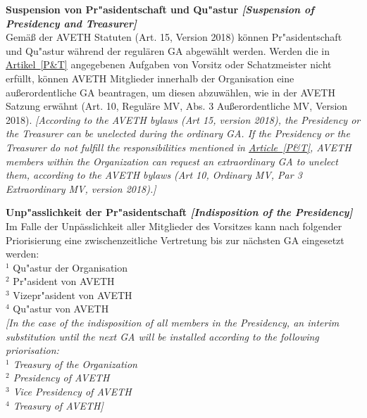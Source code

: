 \documentclass[10pt]{article}
\newcounter{qcounter}
\begin{document}
\begin{list}{{\bf Artikel :~}}{}
\item {\bf Suspension von Pr"asidentschaft und Qu"astur {\it[Suspension of Presidency and Treasurer]}}\label{suspension}\\
Gemäß der AVETH Statuten (Art. 15, Version 2018) können Pr"asidentschaft und Qu"astur während der regulären GA abgewählt werden. Werden die in \hyperref[P&T]{Artikel~\ref{P&T}} angegebenen Aufgaben von Vorsitz oder Schatzmeister nicht erfüllt, können AVETH Mitglieder innerhalb der Organisation eine außerordentliche GA beantragen, um diesen abzuwählen, wie in der AVETH Satzung erwähnt (Art. 10, Reguläre MV, Abs. 3 Außerordentliche MV, Version 2018).
{\it[According to the AVETH bylaws (Art 15, version 2018), the Presidency or the Treasurer can be unelected during the ordinary GA. If the Presidency or the Treasurer do not fulfill the responsibilities mentioned in \hyperref[P&T]{Article~\ref{P&T}}, AVETH members within the Organization can request an extraordinary GA to unelect them, according to the AVETH bylaws (Art 10, Ordinary MV, Par 3 Extraordinary MV, version 2018).]}

\item {\bf Unp"asslichkeit der Pr"asidentschaft {\it[Indisposition of the Presidency]}}\\
Im Falle der Unpässlichkeit aller Mitglieder des Vorsitzes kann nach folgender Priorisierung eine zwischenzeitliche Vertretung bis zur nächsten GA eingesetzt werden:\\
$^{1}$ Qu"astur der Organisation\\
$^{2}$ Pr"asident von AVETH\\
$^{3}$ Vizepr"asident von AVETH\\
$^{4}$ Qu"astur von AVETH\\
{\it[In the case of the indisposition of all members in the Presidency, an interim substitution until the next GA will be installed according to the following priorisation:\\
$^{1}$ Treasury of the Organization\\
$^{2}$ Presidency of AVETH\\
$^{3}$ Vice Presidency of AVETH\\
$^{4}$ Treasury of AVETH]}



\end{list}
\end{document}
